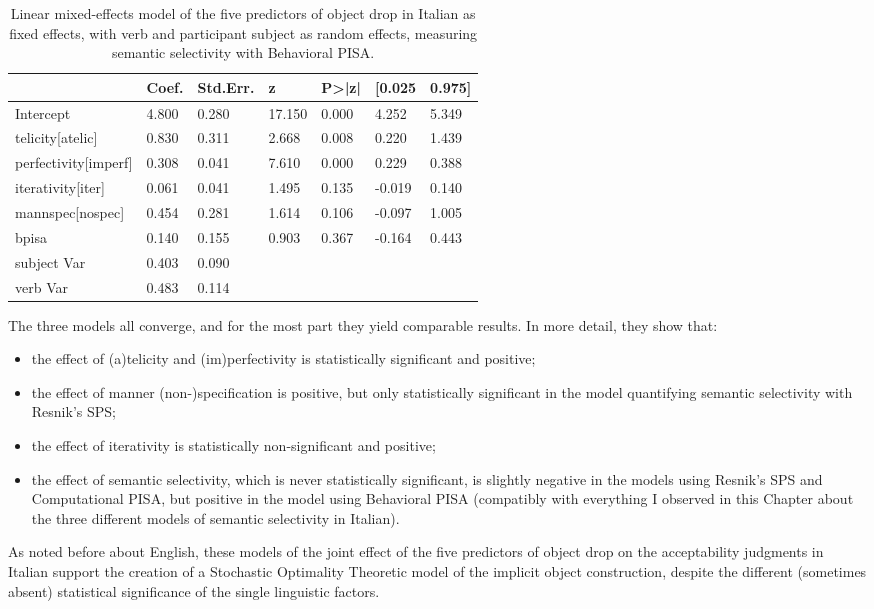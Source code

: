 \begin{table}[htb] %
\caption{Linear mixed-effects model of the five predictors of object drop in Italian as fixed effects, with verb and participant subject as random effects, measuring semantic selectivity with Behavioral PISA.}
\begin{tabular}{l|llllll}
                         & Coef. & Std.Err. & z      & P\textgreater{}|z| & {[}0.025 & 0.975{]} \\
\hline                         
Intercept                & 4.800 & 0.280    & 17.150 & 0.000              & 4.252    & 5.349    \\
telicity{[}atelic{]}     & 0.830 & 0.311    & 2.668  & 0.008              & 0.220    & 1.439    \\
perfectivity{[}imperf{]} & 0.308 & 0.041    & 7.610  & 0.000              & 0.229    & 0.388    \\
iterativity{[}iter{]}    & 0.061 & 0.041    & 1.495  & 0.135              & -0.019   & 0.140    \\
mannspec{[}nospec{]}     & 0.454 & 0.281    & 1.614  & 0.106              & -0.097   & 1.005    \\
bpisa                    & 0.140 & 0.155    & 0.903  & 0.367              & -0.164   & 0.443    \\
subject Var              & 0.403 & 0.090    &        &                    &          &          \\
verb Var                 & 0.483 & 0.114    &        &                    &          &         
\end{tabular}
\end{table}

The three models all converge, and for the most part they yield comparable results. In more detail, they show that:
\begin{itemize}
    \item the effect of (a)telicity and (im)perfectivity is statistically significant and positive;
    \item the effect of manner (non-)specification is positive, but only statistically significant in the model quantifying semantic selectivity with Resnik's SPS;
    \item the effect of iterativity is statistically non-significant and positive;
    \item the effect of semantic selectivity, which is never statistically significant, is slightly negative in the models using Resnik's SPS and Computational PISA, but positive in the model using Behavioral PISA (compatibly with everything I observed in this Chapter about the three different models of semantic selectivity in Italian).
\end{itemize}
As noted before about English, these models of the joint effect of the five predictors of object drop on the acceptability judgments in Italian support the creation of a Stochastic Optimality Theoretic model of the implicit object construction, despite the different (sometimes absent) statistical significance of the single linguistic factors.



